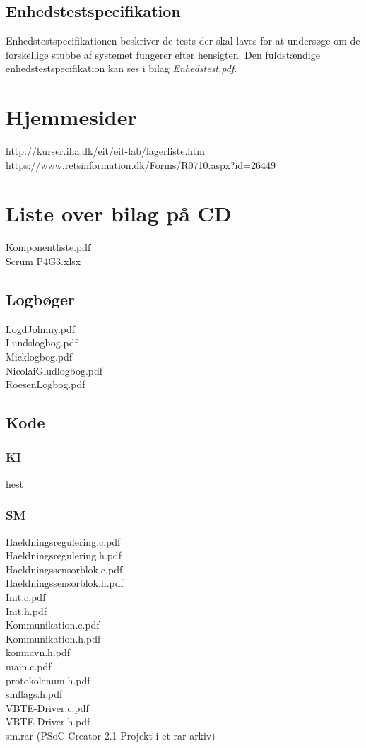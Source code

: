 \subsection{Enhedstestspecifikation}
Enhedstestspecifikationen beskriver de tests der skal laves for at undersøge om de forskellige stubbe af systemet fungerer efter hensigten. Den fuldstændige enhedstestspecifikation kan ses i bilag \textit{Enhedstest.pdf}.

\section{Hjemmesider}
http://kurser.iha.dk/eit/eit-lab/lagerliste.htm\\
https://www.retsinformation.dk/Forms/R0710.aspx?id=26449\\

\section{Liste over bilag på CD}
Komponentliste.pdf\\
Scrum P4G3.xlsx\\
\subsection{Logbøger}
LogdJohnny.pdf\\
Lundslogbog.pdf\\
Micklogbog.pdf\\
NicolaiGludlogbog.pdf\\
RoesenLogbog.pdf\\
\subsection{Kode}
\subsubsection{KI}
hest
\subsubsection{SM}
Haeldningsregulering.c.pdf\\
Haeldningsregulering.h.pdf\\
Haeldningssensorblok.c.pdf\\
Haeldningssensorblok.h.pdf\\
Init.c.pdf\\
Init.h.pdf\\
Kommunikation.c.pdf\\
Kommunikation.h.pdf\\
komnavn.h.pdf\\
main.c.pdf\\
protokolenum.h.pdf\\
smflags.h.pdf\\
VBTE-Driver.c.pdf\\
VBTE-Driver.h.pdf\\
sm.rar (PSoC Creator 2.1 Projekt i et rar arkiv)\\

